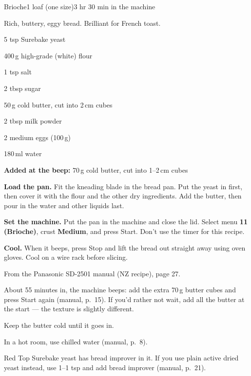 \begin{recipebox}{Brioche}{1 loaf (one size)}{3 hr 30 min in the machine}

Rich, buttery, eggy bread. Brilliant for French toast.

\begin{ingredients}
  \item 5 tsp Surebake yeast
  \item 400\,g high-grade (white) flour
  \item 1 tsp salt
  \item 2 tbsp sugar
  \item 50\,g cold butter, cut into 2\,cm cubes
  \item 2 tbsp milk powder
  \item 2 medium eggs (100\,g)
  \item 180\,ml water
  \item \textbf{Added at the beep:} 70\,g cold butter, cut into 1--2\,cm cubes
\end{ingredients}

\begin{method}
  \item \textbf{Load the pan.} Fit the kneading blade in the bread pan. Put the yeast in first, then cover it with the flour and the other dry ingredients. Add the butter, then pour in the water and other liquids last.
  \item \textbf{Set the machine.} Put the pan in the machine and close the lid. Select menu \textbf{11 (Brioche)}, crust \textbf{Medium}, and press Start. Don't use the timer for this recipe.
  \item \textbf{Cool.} When it beeps, press Stop and lift the bread out straight away using oven gloves. Cool on a wire rack before slicing.
\end{method}

\begin{notelist}
  \item From the Panasonic SD-2501 manual (NZ recipe), page 27.
  \item About 55 minutes in, the machine beeps: add the extra 70\,g butter cubes and press Start again (manual, p.~15). If you'd rather not wait, add all the butter at the start --- the texture is slightly different.
  \item Keep the butter cold until it goes in.
  \item In a hot room, use chilled water (manual, p.~8).
  \item Red Top Surebake yeast has bread improver in it. If you use plain active dried yeast instead, use 1--1 tsp and add bread improver (manual, p.~21).
\end{notelist}

\end{recipebox}

